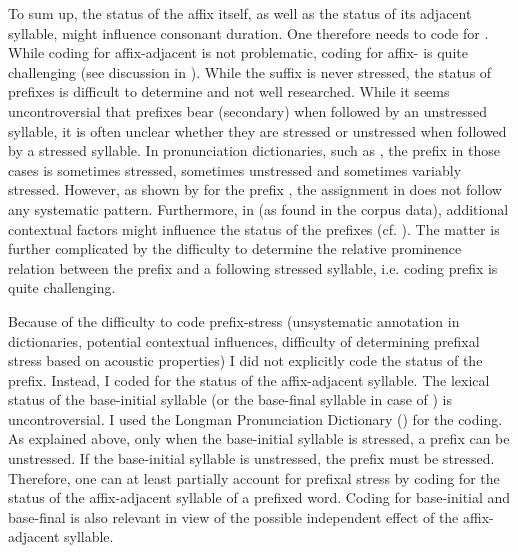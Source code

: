 To sum up, the  status of the affix itself, as well as the  status of its adjacent syllable, might influence consonant duration. One therefore needs to code for .
While coding for affix-adjacent  is not problematic, coding for affix- is quite challenging (see discussion in ). 
While the suffix  is never stressed, the  status of prefixes is difficult to determine and not well researched. While it seems uncontroversial that prefixes bear (secondary)  when followed by an unstressed syllable, it is often unclear whether they are stressed or unstressed when followed by a stressed syllable. In pronunciation dictionaries, such as \cite{Wells.2008}, the prefix in those cases is sometimes stressed, sometimes unstressed and sometimes variably stressed. However, as shown by \cite{Hanote.2010} for the prefix , the  assignment in \cite{Wells.2008} does not follow any systematic pattern. Furthermore, in  (as found in the corpus data), additional contextual factors might influence the  status of the prefixes (cf. \citealt{Videau.2015}). The matter is further complicated by the difficulty to determine the relative prominence relation between the prefix and a following stressed syllable, i.e. coding prefix  is quite challenging. 

Because of the difficulty to code prefix-stress (unsystematic annotation in dictionaries, potential contextual influences, difficulty of determining prefixal stress based on acoustic properties) I did not explicitly code the  status of the prefix.
 Instead, I coded for the  status of the affix-adjacent syllable. The lexical  status of the base-initial syllable (or the base-final syllable in case of ) is uncontroversial. I used the Longman Pronunciation Dictionary (\citealt{Wells.2008}) for the coding.
 As explained above, only when the base-initial syllable is stressed, a prefix can be unstressed. If the base-initial syllable is unstressed, the prefix must be stressed. Therefore, one can at least partially account for prefixal stress by coding for the  status of the affix-adjacent syllable of a prefixed word. 
 Coding for base-initial and base-final  is also relevant in view of the possible independent effect of the affix-adjacent syllable. 
 
